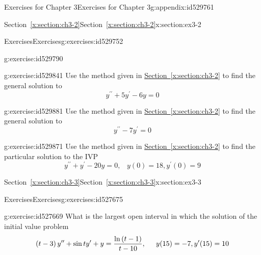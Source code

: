 \documentclass[oneside,10pt,]{book}
\newcommand{\xreffont}{\relax}
\numberwithin{equation}{section}
\numberwithin{equation}{section}
\begin{document}
\begin{appendixptx}{Exercises for Chapter 3}{}{Exercises for Chapter 3}{}{}{g:appendix:id529761}
\begin{sectionptx}{Section~{\xreffont\ref*{x:section:ch3-2}}}{}{Section~{\xreffont\ref*{x:section:ch3-2}}}{}{}{x:section:ex3-2}
\begin{exercises-subsection-numberless}{Exercises}{}{Exercises}{}{}{g:exercises:id529752}
\begin{divisionexercise}{2}{}{}{g:exercise:id529790}
\end{divisionexercise}%
\begin{divisionexercise}{3}{}{}{g:exercise:id529841}%
Use the method given in \hyperref[x:section:ch3-2]{Section~{\xreffont\ref{x:section:ch3-2}}} to find the general solution to%
\begin{equation*}
y^{\prime\prime}+5y^{\prime}-6y=0
\end{equation*}
%
\end{divisionexercise}%
\begin{divisionexercise}{4}{}{}{g:exercise:id529881}%
Use the method given in \hyperref[x:section:ch3-2]{Section~{\xreffont\ref{x:section:ch3-2}}} to find the general solution to%
\begin{equation*}
y^{\prime\prime}-7y^{\prime}=0
\end{equation*}
%
\end{divisionexercise}%
\begin{divisionexercise}{5}{}{}{g:exercise:id529871}%
Use the method given in \hyperref[x:section:ch3-2]{Section~{\xreffont\ref{x:section:ch3-2}}} to find the particular solution to the IVP%
\begin{equation*}
y^{\prime\prime}+y^{\prime}-20y=0,\,\,\,\,\,y(0)=18,y^{\prime}(0)=9
\end{equation*}
%
\end{divisionexercise}%
\end{exercises-subsection-numberless}
\end{sectionptx}
%
%
\typeout{************************************************}
\typeout{Section D.2 Section~{\xreffont\ref*{x:section:ch3-3}}}
\typeout{************************************************}
%
\begin{sectionptx}{Section~{\xreffont\ref*{x:section:ch3-3}}}{}{Section~{\xreffont\ref*{x:section:ch3-3}}}{}{}{x:section:ex3-3}
%
%
\typeout{************************************************}
\typeout{************************************************}
%
\begin{exercises-subsection-numberless}{Exercises}{}{Exercises}{}{}{g:exercises:id527675}
\begin{divisionexercise}{1}{}{}{g:exercise:id527669}%
What is the largest open interval in which the solution of the initial value problem%
\begin{equation*}
\left(t-3\right)y^{\prime\prime}+\sin ty^{\prime}+y=\frac{\ln\left(t-1\right)}{t-10}, \hspace{.2in}
y(15)=-7,y^{\prime}(15)=10
\end{equation*}

\end{divisionexercise}
\end{exercises-subsection-numberless}
\end{sectionptx}
\end{appendixptx}
\end{document}
